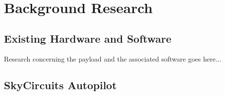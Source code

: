 \chapter{Background Research}





\section{Existing Hardware and Software}
Research concerning the payload and the associated software goes here...

\section{SkyCircuits Autopilot}



